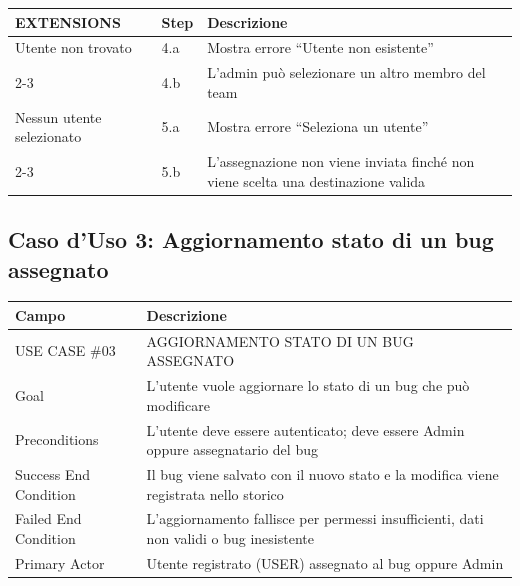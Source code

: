 ﻿\documentclass[a4paper,11pt]{article}
\begin{document}
\vspace{0.5cm}

\begin{tabular}{|p{3cm}|p{1.5cm}|p{9.5cm}|}
\hline
\textbf{EXTENSIONS} & \textbf{Step} & \textbf{Descrizione} \\
\hline
Utente non trovato & 4.a & Mostra errore ``Utente non esistente'' \\
\cline{2-3}
 & 4.b & L'admin pu\`o selezionare un altro membro del team \\
\hline
Nessun utente selezionato & 5.a & Mostra errore ``Seleziona un utente'' \\
\cline{2-3}
 & 5.b & L'assegnazione non viene inviata finch\'e non viene scelta una destinazione valida \\
\hline
\end{tabular}

\subsection{Caso d'Uso 3: Aggiornamento stato di un bug assegnato}

\begin{tabular}{|p{3cm}|p{11cm}|}
\hline
\textbf{Campo} & \textbf{Descrizione} \\
\hline
USE CASE \#03 & AGGIORNAMENTO STATO DI UN BUG ASSEGNATO \\
\hline
Goal & L'utente vuole aggiornare lo stato di un bug che pu\`o modificare \\
\hline
Preconditions & L'utente deve essere autenticato; deve essere Admin oppure assegnatario del bug \\
\hline
Success End Condition & Il bug viene salvato con il nuovo stato e la modifica viene registrata nello storico \\
\hline
Failed End Condition & L'aggiornamento fallisce per permessi insufficienti, dati non validi o bug inesistente \\
\hline
Primary Actor & Utente registrato (USER) assegnato al bug oppure Admin \\
\hline
\end{tabular}

\vspace{0.5cm}
\end{document}
